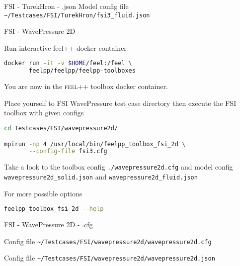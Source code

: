 \begin{frame}{FSI - TurekHron - .json}
Model config file \lstinline{~/Testcases/FSI/TurekHron/fsi3_fluid.json}
\vspace{5mm}


\end{frame}







\begin{frame}{FSI - WavePressure 2D}

Run  interactive feel++ docker container

\begin{lstlisting}[language=Bash,mathescape=false,emph={docker}]
docker run -it -v $HOME/feel:/feel \
       feelpp/feelpp/feelpp-toolboxes
\end{lstlisting}

You are now in the \textsc{feel++} toolbox docker container.

Place yourself to FSI WavePressure test case directory then execute the
FSI toolbox with given configs

\begin{lstlisting}[language=Bash,mathescape=false, emph={feelpp_toolbox_fsi_2d}]
cd Testcases/FSI/wavepressure2d/

mpirun -np 4 /usr/local/bin/feelpp_toolbox_fsi_2d \
       --config-file fsi3.cfg
\end{lstlisting}

Take a look to the toolbox config \lstinline{./wavepressure2d.cfg} and model config
\lstinline{wavepressure2d_solid.json} and \lstinline{wavepressure2d_fluid.json}

For more possible options
\begin{lstlisting}[language=Bash,mathescape=false, emph={feelpp_toolbox_fsi_2d}]
feelpp_toolbox_fsi_2d --help
\end{lstlisting}

\end{frame}


\begin{frame}{FSI - WavePressure 2D - .cfg}

Config file \lstinline{~/Testcases/FSI/wavepressure2d/wavepressure2d.cfg}

\vspace{5mm}
Config file \lstinline{~/Testcases/FSI/wavepressure2d/wavepressure2d.json}


\end{frame}



